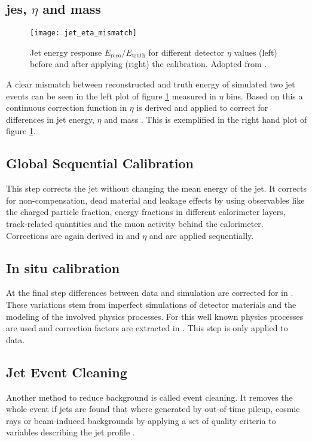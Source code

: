 \subsection{\ac{jes}, $\eta$ and mass}
\begin{figure}
  \centering
  \texttt{[image: jet\_eta\_mismatch]}
  \caption[]{Jet energy response $E_\text{reco}/E_\text{truth}$ for different detector $\eta$ values (left) before and after applying (right) the calibration. Adopted from \citep{jet_eta_calib}.}
  \label{fig:jet_eta_mismatch}
\end{figure}
A clear mismatch between reconstructed and truth energy of simulated two jet events can be seen in the left plot of figure \ref{fig:jet_eta_mismatch} measured in $\eta$ bins. Based on this a continuous correction function in $\eta$ is derived and applied to correct for differences in jet energy, $\eta$ and mass \citep{atlas2011jet,Aaboud:2019aa}. This is exemplified in the right hand plot of figure \ref{fig:jet_eta_mismatch}.

\subsection{Global Sequential Calibration}
This step corrects the jet \pt without changing the mean energy of the jet. It corrects for non-compensation, dead material and leakage effects by using observables like the charged particle fraction, energy fractions in different calorimeter layers, track-related quantities and the muon activity behind the calorimeter. Corrections are again derived in \pt and $\eta$ and are applied sequentially.

\subsection{In situ calibration}
At the final step differences between data and simulation are corrected for in \pt. These variations stem from imperfect simulations of detector materials and the modeling of the involved physics processes. For this well known physics processes are used and correction factors are extracted in \pt. This step is only applied to data.

\subsection{Jet Event Cleaning}
Another method to reduce background is called event cleaning. It removes the whole event if jets are found that where generated by out-of-time pileup, cosmic rays or beam-induced backgrounds by applying a set of quality criteria to variables describing the jet profile \citep{ATLAS-CONF-2015-029}.

